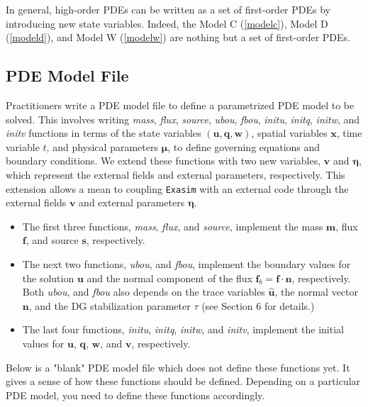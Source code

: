 \documentclass[11pt]{article}
\begin{document}
In general, high-order PDEs can be written as a set of first-order PDEs by introducing new state variables. Indeed, the Model C (\ref{modelc}), Model D (\ref{modeld}), and Model W (\ref{modelw}) are nothing but a set of first-order PDEs. 

\subsection{PDE Model File}

Practitioners write a PDE model file to define a parametrized PDE model to be solved.  This involves writing  {\em mass}, {\em flux},  {\em source}, {\em ubou},  {\em fbou},  {\em initu}, {\em initq}, {\em initw}, and {\em initv} functions in terms of the state variables $(\bm u, \bm q, \bm w)$, spatial variables $\bm x$, time variable $t$, and physical parameters $\bm \mu$, to define governing equations and boundary conditions. We extend these functions with two new variables, $\bm v$ and $\bm \eta$, which represent the external fields and external parameters, respectively. This extension allows a mean to coupling \texttt{Exasim} with an external code through the external fields $\bm v$ and external parameters $\bm \eta$. 

\begin{itemize}
\item The first three functions,  {\em mass},  {\em flux}, and  {\em source},  implement the mass $\bm m$, flux $\bm f$, and source $\bm s$, respectively. 

\item The next two functions,  {\em ubou}, and {\em fbou}, implement the boundary values for the solution $\bm u$ and the normal component of the flux $\bm f_b = \bm f \cdot \bm n$, respectively. Both  {\em ubou}, and {\em fbou} also depends on the trace variables $\widehat{\bm{u}}$, the normal vector $\bm n$, and the DG stabilization parameter $\tau$ (see Section 6 for details.) 

\item The last four functions, {\em initu}, {\em initq}, {\em initw}, and {\em initv}, implement the initial values for $\bm u$, $\bm q$, $\bm w$, and $\bm v$, respectively. 
\end{itemize}

Below is a "blank" PDE model file which does not define these functions yet. It gives a sense of how these functions should be defined. Depending on a particular PDE model, you need to define these functions accordingly. 
\end{document}
